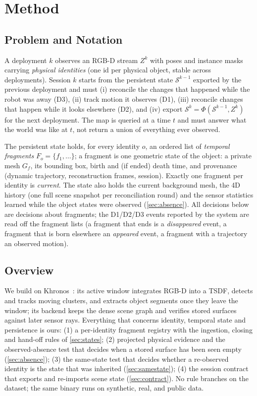 \section{Method}
\label{sec:method}

\subsection{Problem and Notation}
\label{sec:problem}

A deployment $k$ observes an RGB-D stream $Z^k$ with poses and instance masks
carrying \emph{physical identities} (one id per physical object, stable across
deployments). Session $k$ starts from the persistent state $\mathcal{S}^{k-1}$
exported by the previous deployment and must (i) reconcile the changes that
happened while the robot was away (D3), (ii) track motion it observes (D1),
(iii) reconcile changes that happen while it looks elsewhere (D2), and (iv)
export $\mathcal{S}^k=\Phi(\mathcal{S}^{k-1},Z^k)$ for the next deployment. The
map is queried at a time $t$ and must answer what the world was like at $t$,
not return a union of everything ever observed.

The persistent state holds, for every identity $o$, an ordered list of
\emph{temporal fragments} $F_o=\{f_1,\dots\}$; a fragment is one geometric
state of the object: a private mesh $G_f$, its bounding box, birth and (if
ended) death time, and provenance (dynamic trajectory, reconstruction frames,
session). Exactly one fragment per identity is \emph{current}. The state also
holds the current background mesh, the 4D history (one full scene snapshot per
reconciliation round) and the sensor statistics learned while the object states
were observed (\cref{sec:absence}). All decisions below are decisions about
fragments; the D1/D2/D3 events reported by the system are read off the fragment
lists (a fragment that ends is a \emph{disappeared} event, a fragment that is
born elsewhere an \emph{appeared} event, a fragment with a trajectory an
observed motion).

\subsection{Overview}
\label{sec:overview}

We build on Khronos~\cite{schmid2024khronos}: its active window integrates
RGB-D into a TSDF, detects and tracks moving clusters, and extracts object
segments once they leave the window; its backend keeps the dense scene graph and
verifies stored surfaces against later sensor rays. Everything that concerns
identity, temporal state and persistence is ours: (1) a per-identity fragment
registry with the ingestion, closing and hand-off rules of
\cref{sec:states}; (2) projected physical evidence and the observed-absence test
that decides when a stored surface has been seen empty (\cref{sec:absence});
(3) the same-state test that decides whether a re-observed identity is the state
that was inherited (\cref{sec:samestate}); (4) the session contract that exports
and re-imports scene state (\cref{sec:contract}). No rule branches on the
dataset; the same binary runs on synthetic, real, and public data.

